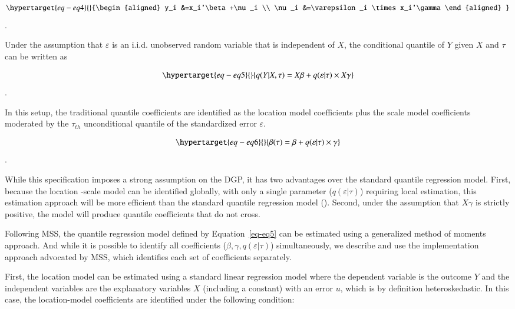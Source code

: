 \documentclass[
  authoryear,
  review,
  1p]{elsarticle}
\begin{document}
\begin{equation}\protect\hypertarget{eq-eq4}{}{\begin{aligned}
y_i &=x_i'\beta+\nu_i \\
\nu_i &=\varepsilon_i \times x_i'\gamma 
\end{aligned}
}\label{eq-eq4}\end{equation}.

Under the assumption that \(\varepsilon\) is an i.i.d. unobserved random variable that is
independent of \(X\), the conditional quantile of \(Y\) given \(X\) and
\(\tau\) can be written as

\begin{equation}\protect\hypertarget{eq-eq5}{}{q(Y|X,\tau) =X\beta+q(\varepsilon|\tau) \times X\gamma 
}\label{eq-eq5}\end{equation}.

In this setup, the traditional quantile coefficients are identified as
the location model coefficients plus the scale model coefficients
moderated by the \(\tau_{th}\) unconditional quantile of the
standardized error \(\varepsilon\).

\begin{equation}\protect\hypertarget{eq-eq6}{}{\beta(\tau) = \beta + q(\varepsilon|\tau) \times \gamma 
}\label{eq-eq6}\end{equation}.

While this specification imposes a strong assumption on the DGP, it has
two advantages over the standard quantile regression model. First,
because the location -scale model can be identified globally, with
only a single parameter (\(q(\varepsilon|\tau)\)) requiring local
estimation, this estimation approach will be more efficient than the
standard quantile regression model (\citet{zhao2000}). Second, under the
assumption that \(X\gamma\) is strictly positive, the model will
produce quantile coefficients that do not cross.

Following MSS, the quantile regression model defined by
Equation~\ref{eq-eq5} can be estimated using a generalized method of moments
approach. And while it is possible to identify all coefficients
(\(\beta,\gamma, q(\varepsilon|\tau)\)) simultaneously, we describe and
use the implementation approach advocated by MSS, which identifies each
set of coefficients separately.

First, the location model can be estimated using a standard linear
regression model where the dependent variable is the outcome \(Y\) and
the independent variables are the explanatory variables \(X\) (including
a constant) with an error \(u\), which is by definition heteroskedastic.
In this case, the location-model coefficients are identified under the
following condition:
\end{document}
